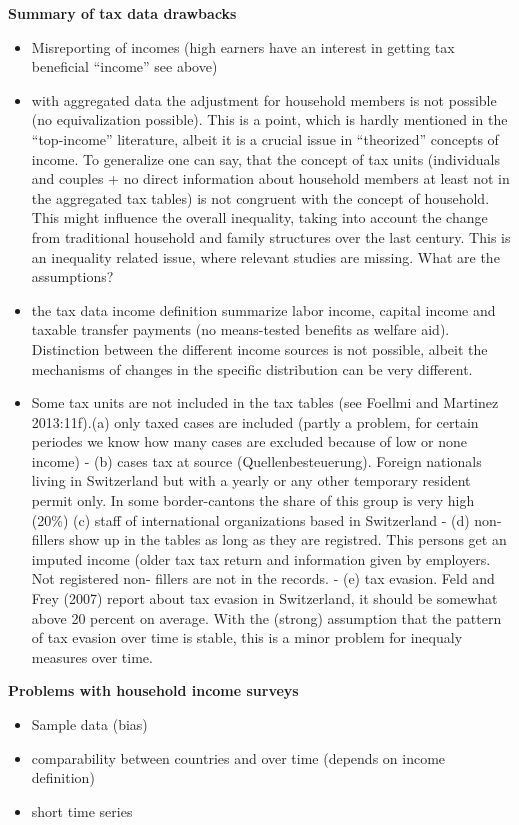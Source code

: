 \documentclass[twoside]{article}\usepackage[]{graphicx}\usepackage[]{color}
\begin{document}
\begin{multicols}{2}
\textbf{Summary of tax data drawbacks}
\begin{itemize}
\item Misreporting of incomes (high earners have an interest in getting tax beneficial ``income'' see above)
\item with aggregated data the adjustment for household members is not possible (no equivalization possible). This is a point, which is hardly mentioned in the ``top-income'' literature, albeit it is a crucial issue in ``theorized'' concepts of income. To generalize one can say, that the concept of tax units (individuals and couples + no direct information about household members at least not in the aggregated tax tables) is not congruent with the concept of household. This might influence the overall inequality, taking into account the change from traditional household and family structures over the last century. This is an inequality related issue, where relevant studies are missing. What are the assumptions?
\item the tax data income definition summarize labor income, capital income and taxable transfer payments (no means-tested benefits as welfare aid). Distinction between the different income sources is not possible, albeit the mechanisms of changes in the specific distribution can be very different.
\item Some tax units are not included in the tax tables (see Foellmi and Martinez 2013:11f).(a) only taxed cases are included (partly a problem, for certain periodes we know how many cases are excluded because of low or none income)	- (b) cases tax at source (Quellenbesteuerung). Foreign nationals living in Switzerland but with a yearly or any other temporary resident permit only. In some border-cantons the share of this group is very high (20\%) 
(c) staff of international organizations based in Switzerland	- (d) non-fillers show up in the tables as long as they are registred. This persons get an imputed income (older tax tax return and information given by employers. Not registered non-	fillers are not in the records.
- (e) tax evasion. Feld and Frey (2007) report about tax evasion in Switzerland, it should be somewhat above 20 percent on average. With the (strong) assumption that the pattern of tax evasion over time is stable, this is a minor problem for inequaly measures over time.
\end{itemize}

\textbf{Problems with household income surveys}
\begin{itemize}
\item Sample data (bias)
\item comparability between countries and over time (depends on income definition)
\item short time series
\end{itemize}


\end{multicols}
\end{document}
